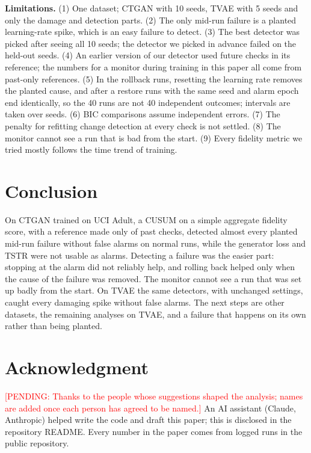 \documentclass[conference]{IEEEtran}
\newcommand{\pending}[1]{\textcolor{red}{[PENDING: #1]}}
\begin{document}
\textbf{Limitations.}
(1) One dataset; CTGAN with 10 seeds, TVAE with 5 seeds and only the
damage and detection parts. (2) The only mid-run failure is a
planted learning-rate spike, which is an easy failure to detect. (3) The best
detector was picked after seeing all 10 seeds; the detector we picked in
advance failed on the held-out seeds. (4) An earlier version of our detector
used future checks in its reference; the numbers for a monitor during
training in this paper all come from past-only references. (5) In the
rollback runs, resetting the learning rate removes the planted cause, and
after a restore runs with the same seed and alarm epoch end identically, so
the 40 runs are not 40 independent outcomes; intervals are taken over seeds.
(6) BIC comparisons assume independent errors. (7) The penalty for
refitting change detection at every check is not settled. (8) The monitor
cannot see a run that is bad from the start. (9) Every fidelity metric we
tried mostly follows the time trend of training.

\section{Conclusion}
On CTGAN trained on UCI Adult, a CUSUM on a simple aggregate fidelity score,
with a reference made only of past checks, detected almost every planted
mid-run failure without false alarms on normal runs, while the generator
loss and TSTR were not usable as alarms. Detecting a failure was the easier
part: stopping at the alarm did not reliably help, and rolling back helped
only when the cause of the failure was removed. The monitor cannot see a run
that was set up badly from the start. On TVAE the same detectors, with
unchanged settings, caught every damaging spike without false alarms. The
next steps are other datasets, the remaining analyses on TVAE, and a failure
that happens on its own rather than being planted.

\section*{Acknowledgment}
\pending{Thanks to the people whose suggestions shaped the analysis; names
are added once each person has agreed to be named.}
An AI assistant (Claude, Anthropic) helped write the code and draft this
paper; this is disclosed in the repository README. Every number in the paper
comes from logged runs in the public repository.



\end{document}
